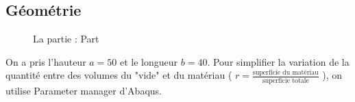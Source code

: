 \documentclass{article}
\begin{document}
\subsection{Géométrie}
\begin{figure}[h]
    \begin{minipage}[h]{0.49\linewidth}
    \end{minipage}
    \hfill
    \begin{minipage}[h]{0.49\linewidth}
    \end{minipage}
    \caption{La partie : Part}
\end{figure}

On a pris l'hauteur $a = 50$ et le longueur $b = 40$. Pour simplifier la variation de la quantité entre des volumes du "vide" et du matériau ( $r = \frac{ \text{superficie du matériau} }{ \text{superficie totale} }$ ), on utilise Parameter manager d'Abaqus.
\end{document}
